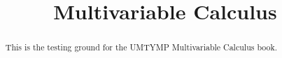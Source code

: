 \documentclass{xourse}
\title{Multivariable Calculus}
\begin{document}
\begin{abstract}
This is the testing ground for the UMTYMP Multivariable Calculus book.
\end{abstract}
\maketitle


\end{document}
